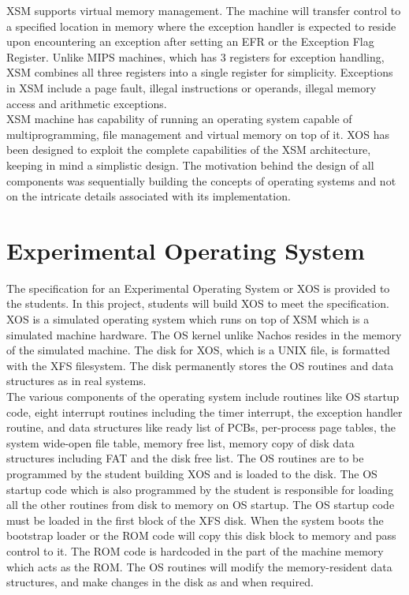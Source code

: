 \documentclass[10pt]{report}
\begin{document}
XSM supports virtual memory management. The machine will transfer control to a specified location in memory where the exception handler is expected to reside upon encountering an exception after setting an EFR or the Exception Flag Register. Unlike MIPS machines\cite{mips}, which has 3 registers for exception handling, XSM combines all three registers into a single register for simplicity. Exceptions in XSM include a page fault, illegal instructions or operands, illegal memory access and arithmetic exceptions. \\

XSM machine has capability of running an operating system capable of multiprogramming, file management and virtual memory on top of it. XOS has been designed to exploit the complete capabilities of the XSM architecture, keeping in mind a simplistic design. The motivation behind the design of all components was sequentially building the concepts of operating systems and not on the intricate details associated with its implementation.




\section{Experimental Operating System }

The specification for an Experimental Operating System or XOS is provided to the students. In this project, students will build XOS to meet the specification. XOS is a simulated operating system which runs on top of XSM which is a simulated machine hardware. The OS kernel unlike Nachos \cite{nachos} resides in the memory of the simulated machine. The disk for XOS, which is a UNIX file,  is formatted with the XFS filesystem. The disk permanently stores the OS routines and data structures as in real systems.  \\

The various components of the operating system include routines like OS startup code, eight interrupt routines including the timer interrupt, the exception handler routine, and data structures like ready list of PCBs, per-process page tables, the system wide-open file table, memory free list, memory copy of disk data structures including FAT and the disk free list. The OS routines are to be programmed by the student building XOS and is loaded to the disk. The OS startup code which is also programmed by the student is responsible for loading all the other routines from disk to memory on OS startup. The OS startup code must be loaded in the first block of the XFS disk. When the system boots the bootstrap loader or the ROM code will copy this disk block to memory and pass control to it. The ROM code is hardcoded in the part of the machine memory which acts as the ROM. The OS routines will modify the memory-resident data structures, and make changes in the disk as and when required. \\
\end{document}
